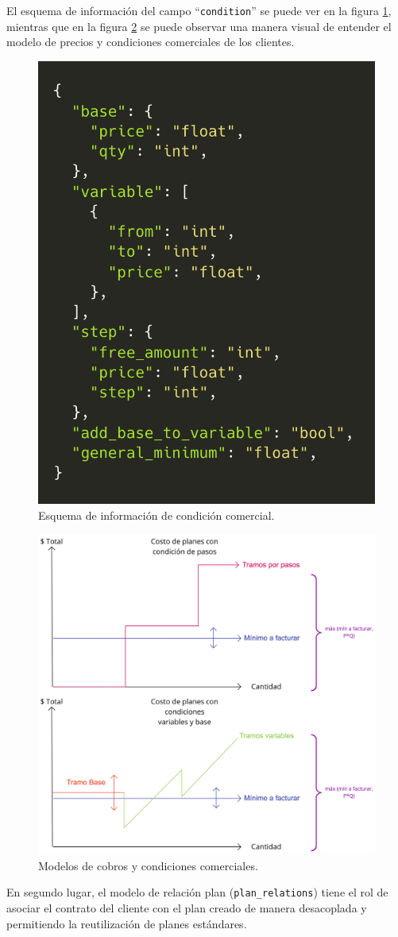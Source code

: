     El esquema de información del campo ``\texttt{condition}'' se puede ver en la figura \ref{fig:cc_condition_schema}, mientras que en la figura \ref{fig:cc_pricing_chart} se puede observar una manera visual de entender el modelo de precios y condiciones comerciales de los clientes.
    
    \begin{figure}
      \centering
      \includegraphics[width=0.4\linewidth]{figures/cc/cc_condition_schema.png}
      \caption{Esquema de información de condición comercial.}
      \label{fig:cc_condition_schema}
    \end{figure}

    \begin{figure}
      \centering
      \includegraphics[width=0.6\linewidth]{figures/cc/cc_pricing_chart.jpg}
      \caption{Modelos de cobros y condiciones comerciales.}
      \label{fig:cc_pricing_chart}
    \end{figure}

    En segundo lugar, el modelo de relación plan (\texttt{plan\_relations}) tiene el rol de asociar el contrato del cliente con el plan creado de manera desacoplada y permitiendo la reutilización de planes estándares. 
    
